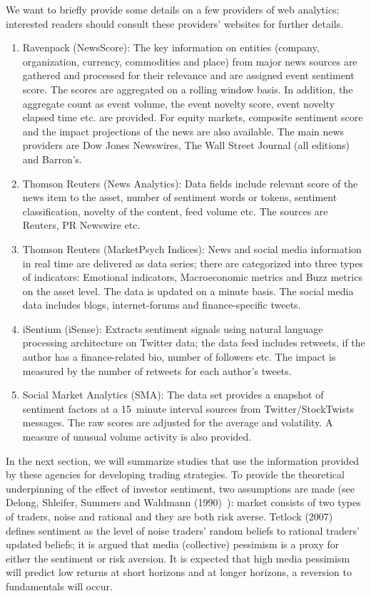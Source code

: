 We want to briefly provide some details on a few providers of web analytics; interested readers should consult these providers' websites for further details.

\begin{enumerate}[--]
\item Ravenpack (NewsScore): The key information on entities (company, organization, currency, commodities and place) from major news sources are gathered and processed for their relevance and are assigned event sentiment score. The scores are aggregated on a rolling window basis. In addition, the aggregate count as event volume, the event novelty score, event novelty elapsed time etc. are provided. For equity markets, composite sentiment score and the impact projections of the news are also available. The main news providers are Dow Jones Newswires, The Wall Street Journal (all editions) and Barron's. 

\item Thomson Reuters (News Analytics): Data fields include relevant score of the news item to the asset, number of sentiment words or tokens, sentiment classification, novelty of the content, feed volume etc. The sources are Reuters, PR Newswire etc. 

\item Thomson Reuters (MarketPsych Indices): News and social media information in real time are delivered as data series; there are categorized into three types of indicators: Emotional indicators, Macroeconomic metrics and Buzz metrics on the asset level. The data is updated on a minute basis. The social media data includes blogs, internet-forums and finance-specific tweets.

\item iSentium (iSense): Extracts sentiment signals using natural language processing architecture on Twitter data; the data feed includes retweets, if the author has a finance-related bio, number of followers etc. The impact is measured by the number of retweets for each author's tweets. 

\item Social Market Analytics (SMA): The data set provides a snapshot of sentiment factors at a 15~minute interval sources from Twitter/StockTwists messages. The raw scores are adjusted for the average and volatility. A measure of unusual volume activity is also provided. 
\end{enumerate}


In the next section, we will summarize studies that use the information provided by these agencies for developing trading strategies. To provide the theoretical underpinning of the effect of investor sentiment, two assumptions are made (see Delong, Shleifer, Summers and Waldmann (1990)~\cite{ssw}): market consists of two types of traders, noise and rational and they are both risk averse. Tetlock (2007)~\cite{tetlock2007giving} defines sentiment as the level of noise traders' random beliefs to rational traders' updated beliefs; it is argued that media (collective) pessimism is a proxy for either the sentiment or risk aversion. It is expected that high media pessimism will predict low returns at short horizons and at longer horizons, a reversion to fundamentals will occur. 



